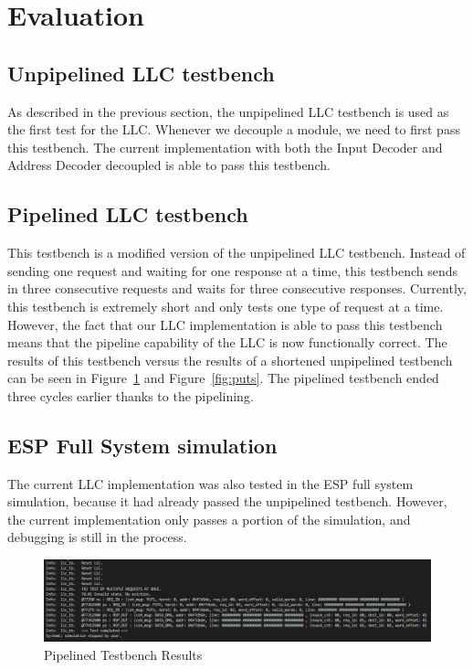 \documentclass{sig-alternate}
\begin{document}
\section{Evaluation}

\subsection{Unpipelined LLC testbench}
As described in the previous section, the unpipelined LLC testbench is used as the first test for the LLC. Whenever we decouple a module, we need to first pass this testbench. The current implementation with both
 the Input Decoder and Address Decoder decoupled is able to pass this testbench.

\subsection{Pipelined LLC testbench}
This testbench is a modified version of the unpipelined LLC testbench. Instead of sending one request and waiting for one response at a time, this testbench sends in three consecutive requests and waits for
 three consecutive responses. Currently, this testbench is extremely short and only tests one type of request at a time. However, the fact that our LLC implementation is able to pass this testbench means that
 the pipeline capability of the LLC is now functionally correct. The results of this testbench versus the results of a shortened unpipelined testbench can be seen in Figure~\ref{fig:mult_puts} and Figure~\ref{fig:puts}. The pipelined testbench ended
 three cycles earlier thanks to the pipelining.

\subsection{ESP Full System simulation}
The current LLC implementation was also tested in the ESP full system simulation, because it had already passed the unpipelined testbench. However, the current implementation only passes a portion of the simulation,
 and debugging is still in the process.

 \begin{figure}[h]
  \centering
  \captionsetup{justification=centering, format=hang}
  \includegraphics[width=1\textwidth]{fig/mult_puts_success.PNG}
  \caption{Pipelined Testbench Results}
  \label{fig:mult_puts}
  \end{figure}
\end{document}
